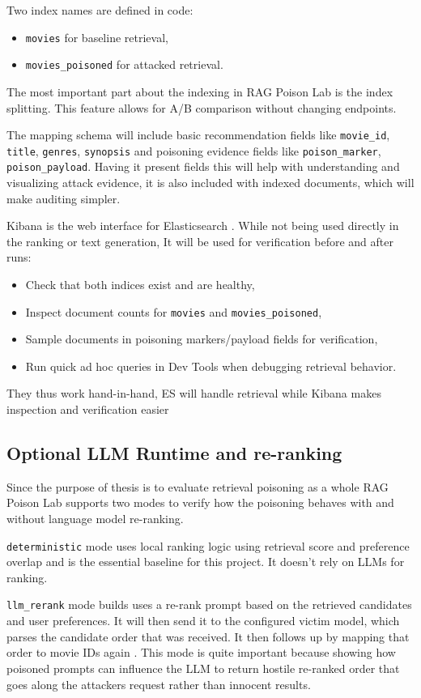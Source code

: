 Two index names are defined in code:
\begin{itemize}
  \item \texttt{movies} for baseline retrieval,
  \item \texttt{movies\_poisoned} for attacked retrieval.
\end{itemize}
The most important part about the indexing in RAG Poison Lab is the index splitting. This feature allows for A/B comparison without changing endpoints.

The mapping schema will include basic recommendation fields like \texttt{movie\_id}, \texttt{title}, \texttt{genres}, \texttt{synopsis} and poisoning evidence fields like \texttt{poison\_marker}, \texttt{poison\_payload}. Having it present fields this will help with understanding and visualizing attack evidence, it is also included with indexed documents, which will make auditing simpler.

Kibana is the web interface for Elasticsearch \cite{elastic_docs_kibana}. While not being used directly in the ranking or text generation, It will be used for verification before and after runs:
\begin{itemize}
  \item Check that both indices exist and are healthy,
  \item Inspect document counts for \texttt{movies} and \texttt{movies\_poisoned},
  \item Sample documents in poisoning markers/payload fields for verification,
  \item Run quick ad hoc queries in Dev Tools when debugging retrieval behavior.
\end{itemize}
They thus work hand-in-hand, ES will handle retrieval while Kibana makes inspection and verification easier

\subsection{Optional LLM Runtime and re-ranking}

Since the purpose of thesis is to evaluate retrieval poisoning as a whole RAG Poison Lab supports two modes to verify how the poisoning behaves with and without language model re-ranking.

\texttt{deterministic} mode uses local ranking logic using retrieval score and preference overlap and is the essential baseline for this project. It doesn't rely on LLMs for ranking.

\texttt{llm\_rerank} mode builds uses a re-rank prompt based on the retrieved candidates and user preferences. It will then send it to the configured victim model, which parses the candidate order that was received. It then follows up by mapping that order to movie IDs again \cite{ragpoisonlab_repo}. This mode is quite important because showing how poisoned prompts can influence the LLM to return  hostile re-ranked order that goes along the attackers request rather than innocent results. 

